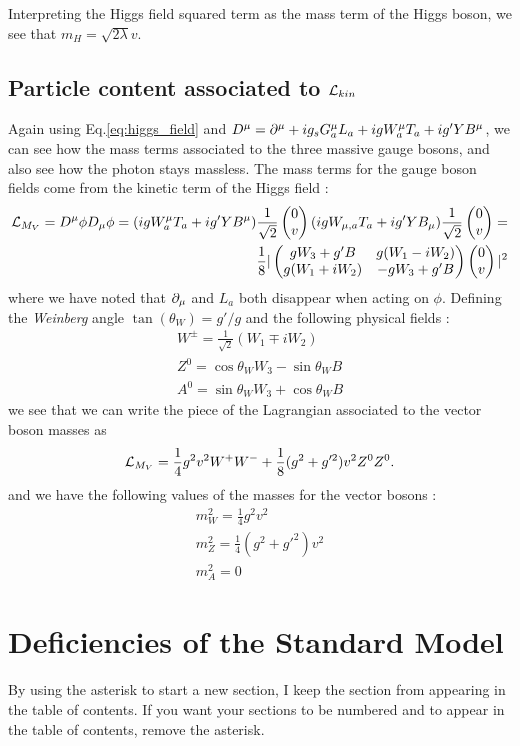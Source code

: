 Interpreting the Higgs field squared term as the mass term of the Higgs boson, we see that $m_H = \sqrt{2 \lambda} v$.

\subsection{Particle content associated to $\mathcal{L}_{kin}$}

Again using Eq.\ref{eq:higgs_field} and $D^\mu = \partial^\mu + ig_s G^\mu_a L_a + i g W^\mu_a T_a + i g' Y B^\mu $, we can see how the mass terms associated to the three massive gauge bosons, and also see how the photon stays massless.
The mass terms for the gauge boson fields come from the kinetic term of the Higgs field :
\begin{equation}
\begin{aligned}
\mathcal{L}_{M_V} = D^\mu \phi D_\mu \phi = (i g W^\mu_a T_a + i g' Y B^\mu ) \frac{1}{\sqrt{2}}\begin{pmatrix} 0 \\ v \end{pmatrix} (i g W_{\mu,a} T_a + i g' Y B_\mu ) \frac{1}{\sqrt{2}}\begin{pmatrix} 0 \\ v \end{pmatrix} = \\
\frac{1}{8} |\begin{pmatrix} gW_3 + g'B & g(W_1 - iW_2) \\ g(W_1 + iW_2) & -gW_3 + g'B \end{pmatrix}  \begin{pmatrix} 0 \\ v \end{pmatrix} |^2
\end{aligned}
\end{equation}
where we have noted that $\partial_\mu$ and $L_a$ both disappear when acting on $\phi$.
Defining the \textit{Weinberg} angle $\tan(\theta_W) = g'/g$ and the following physical fields :
\begin{equation}
\begin{aligned}
W^{\pm} = \frac{1}{\sqrt{2}}(W_1 \mp iW_2) \\
Z^0 = \cos \theta_W W_3 - \sin\theta_W B \\
A^0 = \sin \theta_W W_3 + \cos\theta_W B
\end{aligned}
\end{equation}
we see that we can write the piece of the Lagrangian associated to the vector boson masses as
\begin{equation}
\mathcal{L}_{M_V} = \frac{1}{4} g^2 v^2 W^+ W^- + \frac{1}{8} (g^2 + g'^2)v^2 Z^0 Z^0 .
\end{equation}
and we have the following values of the masses for the vector bosons :
\begin{equation}
\begin{aligned}
m_W^2 = \frac{1}{4} g^2 v^2 \\
m_Z^2 = \frac{1}{4} (g^2 + g'^2) v^2 \\
m_A^2 = 0
\end{aligned}
\end{equation}

\section{Deficiencies of the Standard Model}

By using the asterisk to start a new section, I keep the section from appearing in the table of contents.
If you want your sections to be numbered and to appear in the table of contents, remove the asterisk.
